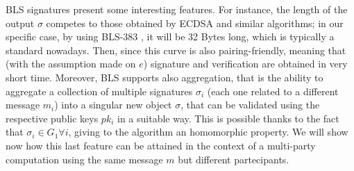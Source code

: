 \documentclass[twocolumn]{article}
\begin{document}
BLS signatures present some interesting features. For instance, the length of the output $\sigma$ competes to those obtained by ECDSA and similar algorithms; in our specific case, by using BLS-383 \citep{bls383}, it will be 32 Bytes long, which is typically a standard nowadays. Then, since this curve is also pairing-friendly, meaning that (with the assumption made on $e$) signature and verification are obtained in very short time. Moreover, BLS supports also aggregation, that is the ability to aggregate a collection of multiple signatures $\sigma_i$ (each one related to a different message $m_i$) into a singular new object $\sigma$, that can be validated using the respective public keys $pk_i$ in a suitable way. This is possible thanks to the fact that $\sigma_i\in G_1 \forall i$, giving to the algorithm an homomorphic property. We will show now how this last feature can be attained in the context of a multi-party computation using the same message $m$ but different partecipants.
\end{document}
